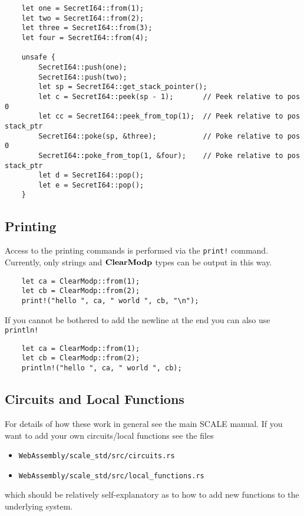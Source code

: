 \begin{lstlisting}
    let one = SecretI64::from(1);
    let two = SecretI64::from(2);
    let three = SecretI64::from(3);
    let four = SecretI64::from(4);

    unsafe {
        SecretI64::push(one);
        SecretI64::push(two);
        let sp = SecretI64::get_stack_pointer();
        let c = SecretI64::peek(sp - 1);       // Peek relative to pos 0
        let cc = SecretI64::peek_from_top(1);  // Peek relative to pos stack_ptr
        SecretI64::poke(sp, &three);           // Poke relative to pos 0
        SecretI64::poke_from_top(1, &four);    // Poke relative to pos stack_ptr
        let d = SecretI64::pop();
        let e = SecretI64::pop();
    }
\end{lstlisting}

\subsection{Printing}
Access to the printing commands is performed via the
\verb|print!| command. 
Currently, only strings and $\mathbf{ClearModp}$ types can be output in this way.
\begin{lstlisting}
    let ca = ClearModp::from(1);
    let cb = ClearModp::from(2);
    print!("hello ", ca, " world ", cb, "\n");
\end{lstlisting}
If you cannot be bothered to add the newline at the end 
you can also use \verb|println!|
\begin{lstlisting}
    let ca = ClearModp::from(1);
    let cb = ClearModp::from(2);
    println!("hello ", ca, " world ", cb);
\end{lstlisting}


\subsection{Circuits and Local Functions}
For details of how these work in general see the main SCALE manual.
If you want to add your own circuits/local functions see the
files
\begin{itemize}
\item \verb|WebAssembly/scale_std/src/circuits.rs|
\item \verb|WebAssembly/scale_std/src/local_functions.rs|
\end{itemize}
which should be relatively self-explanatory as to how to add
new functions to the underlying system.


